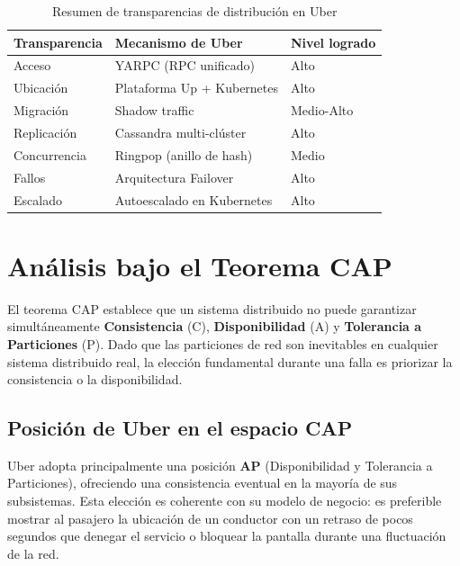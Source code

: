 \documentclass[12pt,a4paper]{article}
\begin{document}
\begin{table}[ht]
  \centering
  \caption{Resumen de transparencias de distribución en Uber}
  \label{tab:transparencias}
  \small
  \vspace{0.2cm}
  \begin{tabular}{lll}
    \toprule
    \textbf{Transparencia} & \textbf{Mecanismo de Uber} & \textbf{Nivel logrado} \\
    \midrule
    Acceso      & YARPC (RPC unificado)           & Alto \\
    Ubicación   & Plataforma Up + Kubernetes      & Alto \\
    Migración   & Shadow traffic                  & Medio-Alto \\
    Replicación & Cassandra multi-clúster         & Alto \\
    Concurrencia& Ringpop (anillo de hash)        & Medio \\
    Fallos      & Arquitectura Failover           & Alto \\
    Escalado    & Autoescalado en Kubernetes      & Alto \\
    \bottomrule
  \end{tabular}
\end{table}

\section{Análisis bajo el Teorema CAP}

El teorema CAP establece que un sistema distribuido no puede garantizar simultáneamente \textbf{Consistencia} (C), \textbf{Disponibilidad} (A) y \textbf{Tolerancia a Particiones} (P). Dado que las particiones de red son inevitables en cualquier sistema distribuido real, la elección fundamental durante una falla es priorizar la consistencia o la disponibilidad.

\subsection{Posición de Uber en el espacio CAP}

Uber adopta principalmente una posición \textbf{AP} (Disponibilidad y Tolerancia a Particiones), ofreciendo una consistencia eventual en la mayoría de sus subsistemas. Esta elección es coherente con su modelo de negocio: es preferible mostrar al pasajero la ubicación de un conductor con un retraso de pocos segundos que denegar el servicio o bloquear la pantalla durante una fluctuación de la red.
\end{document}
